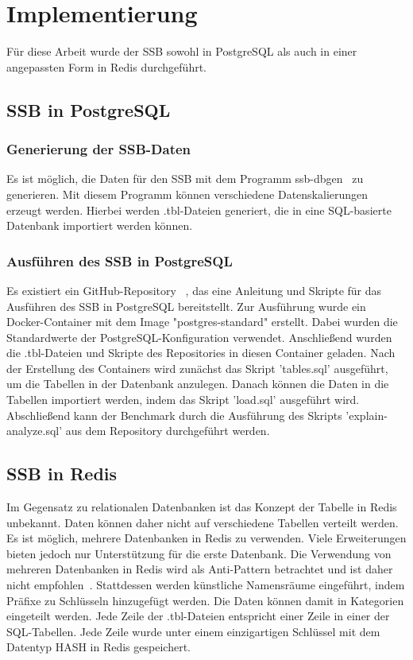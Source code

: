 \chapter{Implementierung}
Für diese Arbeit wurde der \acl{SSB} sowohl in PostgreSQL als auch in einer angepassten Form in Redis durchgeführt.
\section{\acl{SSB} in PostgreSQL}
\subsection{Generierung der \acs{SSB}-Daten}
Es ist möglich, die Daten für den \acl{SSB} mit dem Programm ssb-dbgen~\cite{phillips_electrumssb-dbgen_2023} zu generieren.
Mit diesem Programm können verschiedene Datenskalierungen erzeugt werden.
Hierbei werden .tbl-Dateien generiert, die in eine SQL-basierte Datenbank importiert werden können.
\subsection{Ausführen des \acl{SSB} in PostgreSQL}

Es existiert ein GitHub-Repository ~\cite{nukoyokohama_ssb-postgres_2023}, das eine Anleitung und Skripte für das Ausführen des \ac{SSB} in PostgreSQL bereitstellt.
Zur Ausführung wurde ein Docker-Container mit dem Image "postgres-standard" erstellt.
Dabei wurden die Standardwerte der PostgreSQL-Konfiguration verwendet.
Anschließend wurden die .tbl-Dateien und Skripte des Repositories in diesen Container geladen. %
Nach der Erstellung des Containers wird zunächst das Skript 'tables.sql' ausgeführt, um die Tabellen in der Datenbank anzulegen.
Danach können die Daten in die Tabellen importiert werden, indem das Skript 'load.sql' ausgeführt wird.
Abschließend kann der Benchmark durch die Ausführung des Skripts 'explain-analyze.sql' aus dem Repository durchgeführt werden.

\section{\acs{SSB} in Redis}
Im Gegensatz zu relationalen Datenbanken ist das Konzept der Tabelle in Redis unbekannt.
Daten können daher nicht auf verschiedene Tabellen verteilt werden.
Es ist möglich, mehrere Datenbanken in Redis zu verwenden. Viele Erweiterungen bieten jedoch nur Unterstützung für die erste Datenbank.
Die Verwendung von mehreren Datenbanken in Redis wird als Anti-Pattern betrachtet und ist daher nicht empfohlen~\cite{prickett_answer_2022}.
Stattdessen werden künstliche Namensräume eingeführt, indem Präfixe zu Schlüsseln hinzugefügt werden.
Die Daten können damit in Kategorien eingeteilt werden.
Jede Zeile der .tbl-Dateien entspricht einer Zeile in einer der SQL-Tabellen.
Jede Zeile wurde unter einem einzigartigen Schlüssel mit dem Datentyp HASH in Redis gespeichert.

